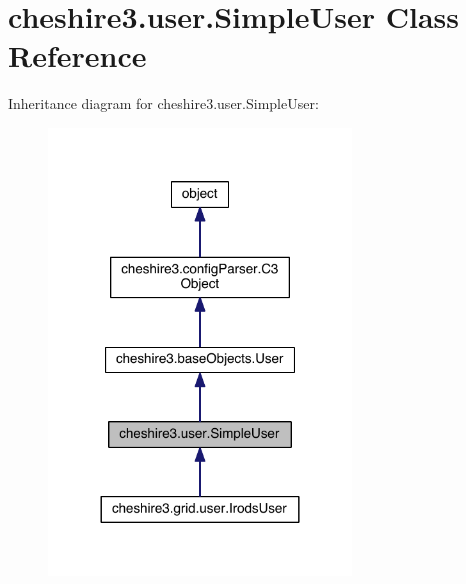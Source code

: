 \hypertarget{classcheshire3_1_1user_1_1_simple_user}{\section{cheshire3.\-user.\-Simple\-User Class Reference}
\label{classcheshire3_1_1user_1_1_simple_user}
}


Inheritance diagram for cheshire3.\-user.\-Simple\-User\-:
\nopagebreak
\begin{figure}[H]
\begin{center}
\leavevmode
\includegraphics[width=228pt]{classcheshire3_1_1user_1_1_simple_user__inherit__graph}
\end{center}
\end{figure}


